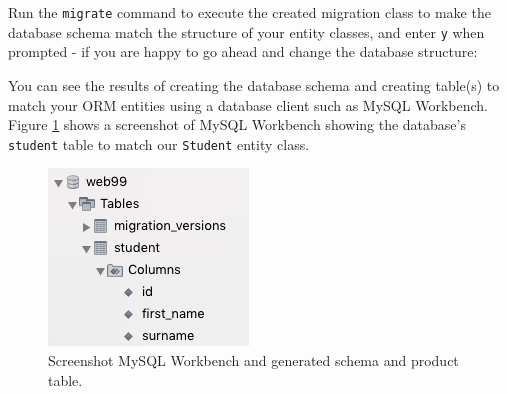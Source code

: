 \documentclass[a4paperpaper,openright]{book}
\newenvironment{Shaded}{}{}
\newcommand{\ExtensionTok}[1]{#1}
\newcommand{\NormalTok}[1]{#1}
\newcommand{\OperatorTok}[1]{\textcolor[rgb]{0.40,0.40,0.40}{#1}}
\begin{document}
Run the \texttt{migrate} command to execute the created migration class
to make the database schema match the structure of your entity classes,
and enter \texttt{y} when prompted - if you are happy to go ahead and
change the database structure:

\begin{Shaded}
\end{Shaded}

You can see the results of creating the database schema and creating
table(s) to match your ORM entities using a database client such as
MySQL Workbench. Figure \ref{db_schema} shows a screenshot of MySQL
Workbench showing the database's \texttt{student} table to match our
\texttt{Student} entity class.

\begin{figure}
\centering
\includegraphics{./tex2pdf.-65f13e14688ab55b/30c41e5c5578a73fe9d7d82f45da81b21af7455c.png}
\caption{Screenshot MySQL Workbench and generated schema and product
table. \label{db_schema}}
\end{figure}
\end{document}
